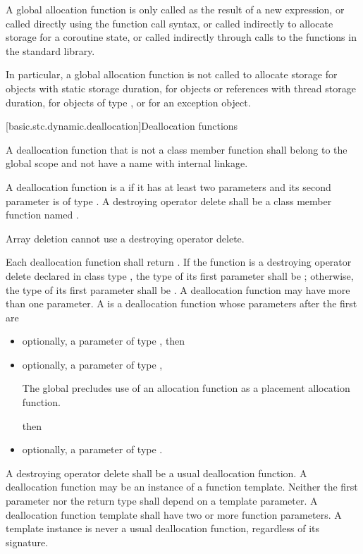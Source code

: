 \pnum
A global allocation function is only called as the result of a new
expression, or called directly using the function call
syntax, or called indirectly to allocate storage for
a coroutine state,
or called indirectly through calls to the
functions in the \Cpp{} standard library.
\begin{note}
In particular, a
global allocation function is not called to allocate storage for objects
with static storage duration, for objects or references
with thread storage duration, for objects of
type , or for an
exception object.
\end{note}

[basic.stc.dynamic.deallocation]{Deallocation functions}

\pnum
{}%
A deallocation function that is not a class member function
shall belong to the global scope and not have a name with internal linkage.

\pnum
A deallocation function
is a 
if it has at least two parameters
and its second parameter
is of type .
A destroying operator delete
shall be a class member function named .
\begin{note}
Array deletion cannot use a destroying operator delete.
\end{note}

\pnum
{}%
Each deallocation function shall return .
If the function is a destroying operator delete
declared in class type ,
the type of its first parameter shall be ;
otherwise, the type of its first
parameter shall be . A deallocation function may have more
than one parameter.
%
A  is a deallocation function
whose parameters after the first are
\begin{itemize}
\item
optionally, a parameter of type , then
\item
optionally, a parameter of type ,
\begin{footnote}
The global 
precludes use of an
allocation function  as a placement
allocation function.
\end{footnote}
then
\item
optionally, a parameter of type .
\end{itemize}
A destroying operator delete shall be a usual deallocation function.
A deallocation function may be an instance of a function
template. Neither the first parameter nor the return type shall depend
on a template parameter.
A deallocation
function template shall have two or more function parameters. A template
instance is never a usual deallocation function, regardless of its
signature.

